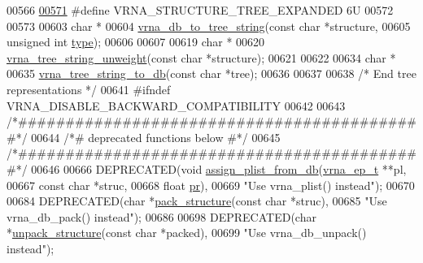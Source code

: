 \begin{DoxyCode}
00566 
\hyperlink{group__struct__utils__tree_gab3b65489d1322da65d3a3e53242307ef}{00571} \textcolor{preprocessor}{#define   VRNA\_STRUCTURE\_TREE\_EXPANDED        6U}
00572 
00573 
00603 \textcolor{keywordtype}{char} *
00604 \hyperlink{group__struct__utils__tree_ga56551ab7da64933a7230d29430f40cfe}{vrna\_db\_to\_tree\_string}(\textcolor{keyword}{const} \textcolor{keywordtype}{char}   *structure,
00605                        \textcolor{keywordtype}{unsigned} \textcolor{keywordtype}{int} \hyperlink{group__struct__utils__plist_a11715ffa51cb6277db7ebd3d9170d691}{type});
00606 
00607 
00619 \textcolor{keywordtype}{char} *
00620 \hyperlink{group__struct__utils__tree_gaa31da26a3f582ddc35a84ff1b9c0a2b0}{vrna\_tree\_string\_unweight}(\textcolor{keyword}{const} \textcolor{keywordtype}{char} *structure);
00621 
00622 
00634 \textcolor{keywordtype}{char} *
00635 \hyperlink{group__struct__utils__tree_ga99d280319a7fd3f87e9f0d8c44520774}{vrna\_tree\_string\_to\_db}(\textcolor{keyword}{const} \textcolor{keywordtype}{char} *tree);
00636 
00637 
00638 \textcolor{comment}{/* End tree representations */}
00641 \textcolor{preprocessor}{#ifndef VRNA\_DISABLE\_BACKWARD\_COMPATIBILITY}
00642 
00643 \textcolor{comment}{/*###########################################*/}
00644 \textcolor{comment}{/*# deprecated functions below              #*/}
00645 \textcolor{comment}{/*###########################################*/}
00646 
00666 DEPRECATED(\textcolor{keywordtype}{void} \hyperlink{group__part__func__global__deprecated_gab61df77cf7949cd516181fce0c3d7d78}{assign\_plist\_from\_db}(\hyperlink{group__struct__utils__plist_structvrna__elem__prob__s}{vrna\_ep\_t}  **pl,
00667                                      \textcolor{keyword}{const} \textcolor{keywordtype}{char} *struc,
00668                                      \textcolor{keywordtype}{float}      \hyperlink{fold__vars_8h_ac98ec419070aee6831b44e5c700f090f}{pr}),
00669            \textcolor{stringliteral}{"Use vrna\_plist() instead"});
00670 
00684 DEPRECATED(\textcolor{keywordtype}{char} *\hyperlink{group__struct__utils__deprecated_gac6dfa5e22928c087c6e09ff0054a7ced}{pack\_structure}(\textcolor{keyword}{const} \textcolor{keywordtype}{char} *struc),
00685            \textcolor{stringliteral}{"Use vrna\_db\_pack() instead"});
00686 
00698 DEPRECATED(\textcolor{keywordtype}{char} *\hyperlink{group__struct__utils__deprecated_ga071c6921efe1eb974f115ee6fefa3c39}{unpack\_structure}(\textcolor{keyword}{const} \textcolor{keywordtype}{char} *packed),
00699            \textcolor{stringliteral}{"Use vrna\_db\_unpack() instead"});

\end{DoxyCode}
